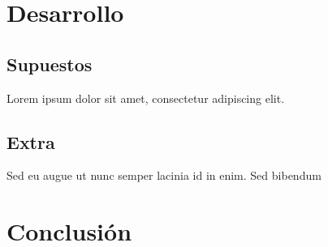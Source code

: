 \documentclass[12pt]{article}
\begin{document}
\section{Desarrollo}

\subsection{Supuestos}

Lorem ipsum dolor sit amet, consectetur adipiscing elit. 

\subsection{Extra}

Sed eu augue ut nunc semper lacinia id in enim. Sed bibendum 

\section{Conclusión}
\end{document}
